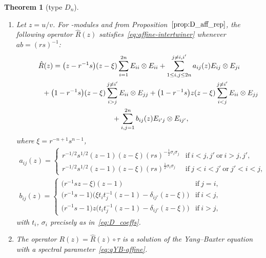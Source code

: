 \documentclass[pdftex]{sigma}
\numberwithin{equation}{section}
\newtheorem{Theorem}{Theorem}[section]
\newcommand{\sso}{\mathfrak{so}}
\begin{document}
\begin{Theorem}[type $D_{n}$]\label{thm:D_AffRMatrix} \quad
\begin{enumerate}
\item[$(a)$] Let $z = u/v$. For \smash{$U_{r,s}\bigl(\widehat{\sso}_{2n}\bigr)$}-modules  and  from Proposition~$\ref{prop:D_aff_rep}$, the following operator $\hat{R}(z)$ satisfies~\eqref{eq:affine-intertwiner} whenever $ab = (rs)^{-1}$:
\begin{gather}
 \hat{R}(z) =
 \bigl(z - r^{-1}s\bigr)(z - \xi)\sum_{i = 1}^{2n}E_{ii} \otimes E_{ii} + \sum_{1 \le i,j \le 2n}^{j \neq i,i'}a_{ij}(z)E_{ij} \otimes E_{ji} \nonumber\\
 \hphantom{ \hat{R}(z) =}{}
 + \bigl(1 - r^{-1}s\bigr)(z - \xi)\sum_{i > j}^{j \neq i'}E_{ii} \otimes E_{jj} + \bigl(1 - r^{-1}s\bigr)z(z - \xi)\sum_{i < j}^{j \neq i'}E_{ii} \otimes E_{jj} \nonumber\\
 \hphantom{ \hat{R}(z) =}{}
 + \sum_{i,j = 1}^{2n} b_{ij}(z)E_{i'j} \otimes E_{ij'},\label{eq:D_AffRMatrix}
\end{gather}
where $\xi = r^{-n + 1}s^{n - 1}$,
\begin{gather*}
 a_{ij}(z) =
 \begin{cases}
 r^{-1/2}s^{1/2}(z - 1)(z - \xi)(rs)^{-\frac{1}{2}\sigma_{i}\sigma_{j}} &
 \text{if}\ i < j,j'\ \text{or}\ i > j,j', \\
 r^{-1/2}s^{1/2}(z - 1)(z - \xi)(rs)^{\frac{1}{2}\sigma_{i}\sigma_{j}} &
 \text{if}\ j < i < j'\ \text{or}\ j' < i < j,
 \end{cases}
\\
 b_{ij}(z) =
 \begin{cases}
 \bigl(r^{-1}sz - \xi\bigr)(z - 1) & \text{if}\ j = i ,\\
 \bigl(r^{-1}s - 1\bigr)\bigl(\xi t_{i}t_{j}^{-1}(z - 1) - \delta_{ij'}(z - \xi)\bigr) & \text{if}\ i < j ,\\
 \bigl(r^{-1}s - 1\bigr)z\bigl(t_{i}t_{j}^{-1}(z - 1) - \delta_{ij'}(z - \xi)\bigr) & \text{if}\ i > j,
 \end{cases}
\end{gather*}
with $t_{i}$, $\sigma_{i}$ precisely as in~\eqref{eq:D_coeffs}.


\item[$(b)$] The operator $R(z)=\hat{R}(z)\circ \tau$ is a solution of the Yang--Baxter equation with a spectral parameter~\eqref{eq:qYB-affine}.
\end{enumerate}
\end{Theorem}
\end{document}
